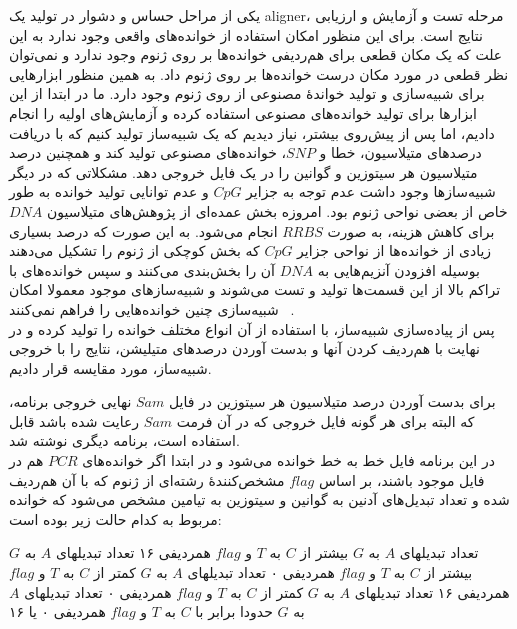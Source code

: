 یکی از مراحل حساس و دشوار در تولید یک aligner، مرحله تست و آزمایش و ارزیابی نتایج است. برای این منظور امکان استفاده از خوانده‌های واقعی وجود ندارد به این علت که یک مکان قطعی برای هم‌ردیفی خوانده‌ها بر روی ژنوم وجود ندارد و نمی‌توان نظر قطعی در مورد مکان درست خوانده‌ها بر روی ژنوم داد. به همین منظور ابزارهایی برای شبیه‌سازی و تولید خواندهٔ مصنوعی از روی ژنوم وجود دارد. ما در ابتدا از این ابزارها برای تولید خوانده‌های مصنوعی استفاده کرده و آزمایش‌های اولیه را انجام دادیم، اما پس از پیش‌روی بیشتر، نیاز دیدیم که یک شبیه‌ساز تولید کنیم که با دریافت درصدهای متیلاسیون، خطا و $SNP$، خوانده‌های مصنوعی تولید کند و همچنین درصد متیلاسیون هر سیتوزین و گوانین را در یک فایل خروجی دهد. مشکلاتی که در دیگر شبیه‌سازها وجود داشت عدم توجه به جزایر $CpG$ و عدم توانایی تولید خوانده‌ به طور خاص از بعضی نواحی ژنوم بود. امروزه بخش عمده‌ای از پژوهش‌های متیلاسیون $DNA$ برای کاهش هزینه، به صورت $RRBS$ انجام می‌شود. به این صورت که درصد بسیاری زیادی از خوانده‌ها از نواحی جزایر $CpG$ که بخش کوچکی از ژنوم را تشکیل می‌دهند بوسیله افزودن آنزیم‌هایی به $DNA$ آن را بخش‌بندی می‌کنند و سپس خوانده‌های با تراکم بالا از این قسمت‌ها تولید و تست می‌شوند و شبیه‌سازهای موجود معمولا امکان شبیه‌سازی چنین خوانده‌هایی را فراهم نمی‌کنند
~\cite{guo2013bs}.
\\
پس از پیاده‌سازی شبیه‌ساز، با استفاده از آن انواع مختلف خوانده را تولید کرده و در نهایت با هم‌ردیف کردن آنها و بدست آوردن درصدهای متیلیشن، نتایج را با خروجی شبیه‌ساز، مورد مقایسه قرار دادیم.


برای بدست آوردن درصد متیلاسیون هر سیتوزین در فایل $Sam$ نهایی خروجی برنامه، که البته برای هر گونه فایل خروجی که در آن فرمت $Sam$ رعایت شده باشد قابل استفاده است، برنامه دیگری نوشته شد.
\\
در این برنامه فایل خط به خط خوانده می‌شود و در ابتدا اگر خوانده‌های $PCR$ هم در فایل موجود باشند، بر اساس $flag$ مشخص‌کنندهٔ رشته‌ای از ژنوم که با آن هم‌ردیف شده و تعداد تبدیل‌های آدنین به گوانین و سیتوزین به تیامین مشخص می‌شود که خوانده مربوط به کدام حالت زیر بوده است:

 تعداد تبدیلهای $A$ به $G$ بیشتر از $C$ به $T$ و $flag$ همردیفی ۱۶
 تعداد تبدیلهای $A$ به $G$ بیشتر از $C$ به $T$ و $flag$ همردیفی ۰
 تعداد تبدیلهای $A$ به $G$ کمتر از $C$ به $T$ و $flag$ همردیفی ۱۶
 تعداد تبدیلهای $A$ به $G$ کمتر از $C$ به $T$ و $flag$ همردیفی ۰
 تعداد تبدیلهای $A$ به $G$ حدودا برابر با  $C$ به $T$ و $flag$ همردیفی ۰ یا ۱۶

